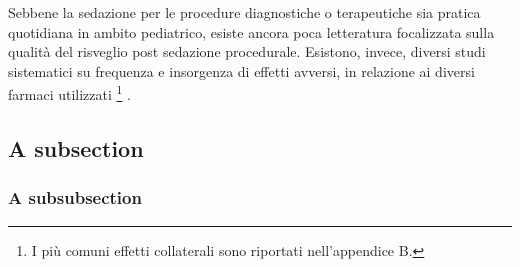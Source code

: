 Sebbene la sedazione per le procedure diagnostiche o terapeutiche sia pratica quotidiana in ambito pediatrico, esiste ancora poca letteratura focalizzata sulla qualità del risveglio post sedazione procedurale. Esistono, invece, diversi studi sistematici su frequenza e insorgenza di effetti avversi, in relazione ai diversi farmaci utilizzati \footnote{I più comuni effetti collaterali sono riportati nell'appendice B.} \citep{Bellolio2016}. 

\subsection{A subsection}

\lipsum[3]

\subsubsection{A subsubsection}

\lipsum[4]